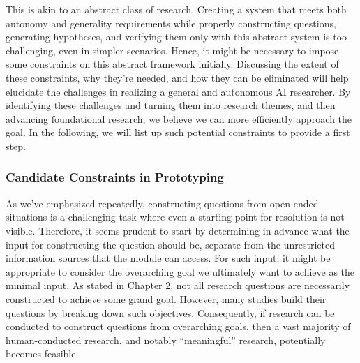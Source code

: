 This is akin to an abstract class of research. Creating a system that meets both autonomy and generality requirements while properly constructing questions, generating hypotheses, and verifying them only with this abstract system is too challenging, even in simpler scenarios. Hence, it might be necessary to impose some constraints on this abstract framework initially. Discussing the extent of these constraints, why they're needed, and how they can be eliminated will help elucidate the challenges in realizing a general and  autonomous AI researcher. By identifying these challenges and turning them into research themes, and then advancing foundational research, we believe we can more efficiently approach the goal. In the following, we will list up such potential constraints to provide a first step.

\subsubsection{Candidate Constraints in Prototyping}

As we've emphasized repeatedly, constructing questions from open-ended situations is a challenging task where even a starting point for resolution is not visible. Therefore, it seems prudent to start by determining in advance what the input for constructing the question should be, separate from the unrestricted information sources that the module can access. For such input, it might be appropriate to consider the overarching goal we ultimately want to achieve as the minimal input. As stated in Chapter 2, not all research questions are necessarily constructed to achieve some grand goal. However, many studies build their questions by breaking down such objectives. Consequently, if research can be conducted to construct questions from overarching goals, then a vast majority of human-conducted research, and notably ``meaningful'' research, potentially becomes feasible.


